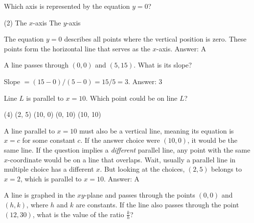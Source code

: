\documentclass[11pt,paper=a4,answers]{exam}
\begin{document}
\begin{questions}
\question
Which axis is represented by the equation $y = 0$?
\begin{tasks}(2)
    \task The $x$-axis
    \task The $y$-axis
\end{tasks}

\begin{solution}
The equation $y = 0$ describes all points where the vertical position is zero. These points form the horizontal line that serves as the $x$-axis.
\vspace{15pt}
Answer: \colorbox{yellow!100}{A}
\end{solution}

\question
A line passes through $(0, 0)$ and $(5, 15)$. What is its slope?

\begin{solution}
Slope $= (15 - 0) / (5 - 0) = 15 / 5 = 3$.
\vspace{15pt}
Answer: \colorbox{yellow!100}{3}
\end{solution}

\question
Line $L$ is parallel to $x = 10$. Which point could be on line $L$?
\begin{tasks}(4)
    \task (2, 5)
    \task (10, 0)
    \task (0, 10)
    \task (10, 10)
\end{tasks}

\begin{solution}
A line parallel to $x = 10$ must also be a vertical line, meaning its equation is $x = c$ for some constant $c$. If the answer choice were $(10, 0)$, it would be the same line. If the question implies a \textit{different} parallel line, any point with the same $x$-coordinate would be on a line that overlaps. Wait, usually a parallel line in multiple choice has a different $x$. But looking at the choices, $(2, 5)$ belongs to $x=2$, which is parallel to $x=10$.
\vspace{15pt}
Answer: \colorbox{yellow!100}{A}
\end{solution}

\question
A line is graphed in the $xy$-plane and passes through the points $(0, 0)$ and $(h, k)$, where $h$ and $k$ are constants. If the line also passes through the point $(12, 30)$, what is the value of the ratio $\frac{k}{h}$?


\end{questions}
\end{document}
